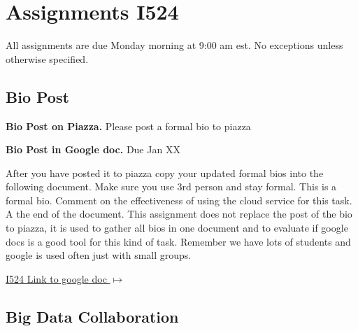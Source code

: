 \section{Assignments I524} \label{s:i524-assignments}

All assignments are due Monday morning at 9:00 am est. No exceptions unless otherwise specified.

\subsection{Bio Post}

\begin{exercise} \label{a:i524-bio-piazza}

{\bf Bio Post on Piazza.} Please post a formal bio to piazza

\end{exercise}

\begin{exercise} \label{a:i524-bio-googledocs}

 {\bf Bio Post in Google doc.} Due Jan XX
 
 After you have posted it to piazza copy your updated formal bios into the following document.  Make sure you use 3rd person and stay formal. This is a formal bio. Comment on the effectiveness of using the cloud service for this task. A the end of the document. This assignment does not replace the post of the bio to piazza, it is used to gather all bios in one document and to evaluate if google docs is a good tool for this kind of task. Remember we have lots of students and google is used often just with small groups.

 \smallskip

{\hfill \href{https://docs.google.com/document/d/1ejzlKYqC3dLac8WXVpcPQsJh1j4BDqRxxgGg1cFQbeQ/edit?usp=sharing}{I524 Link to google doc $\mapsto$}}

 \end{exercise}

\subsection{Big Data Collaboration}

